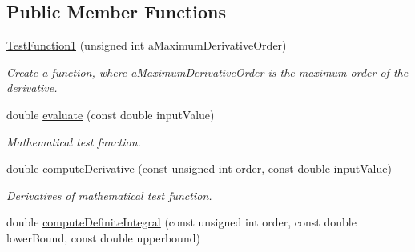 \subsection*{Public Member Functions}
\begin{DoxyCompactItemize}
\item 
\hyperlink{structtudat_1_1unit__tests_1_1TestFunction1_a3bd10e1b68f5d057f3b193e178b6364e}{Test\+Function1} (unsigned int a\+Maximum\+Derivative\+Order)\hypertarget{structtudat_1_1unit__tests_1_1TestFunction1_a3bd10e1b68f5d057f3b193e178b6364e}{}\label{structtudat_1_1unit__tests_1_1TestFunction1_a3bd10e1b68f5d057f3b193e178b6364e}

\begin{DoxyCompactList}\small\item\em Create a function, where a\+Maximum\+Derivative\+Order is the maximum order of the derivative. \end{DoxyCompactList}\item 
double \hyperlink{structtudat_1_1unit__tests_1_1TestFunction1_ac8b0089177fd73eac4cc3f4cf80807ec}{evaluate} (const double input\+Value)\hypertarget{structtudat_1_1unit__tests_1_1TestFunction1_ac8b0089177fd73eac4cc3f4cf80807ec}{}\label{structtudat_1_1unit__tests_1_1TestFunction1_ac8b0089177fd73eac4cc3f4cf80807ec}

\begin{DoxyCompactList}\small\item\em Mathematical test function. \end{DoxyCompactList}\item 
double \hyperlink{structtudat_1_1unit__tests_1_1TestFunction1_ad5c6ff20438f21b73c9148897c4e5c3c}{compute\+Derivative} (const unsigned int order, const double input\+Value)\hypertarget{structtudat_1_1unit__tests_1_1TestFunction1_ad5c6ff20438f21b73c9148897c4e5c3c}{}\label{structtudat_1_1unit__tests_1_1TestFunction1_ad5c6ff20438f21b73c9148897c4e5c3c}

\begin{DoxyCompactList}\small\item\em Derivatives of mathematical test function. \end{DoxyCompactList}\item 
double \hyperlink{structtudat_1_1unit__tests_1_1TestFunction1_abdca794bafaa237e6dccd248a9dda59b}{compute\+Definite\+Integral} (const unsigned int order, const double lower\+Bound, const double upperbound)\hypertarget{structtudat_1_1unit__tests_1_1TestFunction1_abdca794bafaa237e6dccd248a9dda59b}{}\label{structtudat_1_1unit__tests_1_1TestFunction1_abdca794bafaa237e6dccd248a9dda59b}


\end{DoxyCompactItemize}
